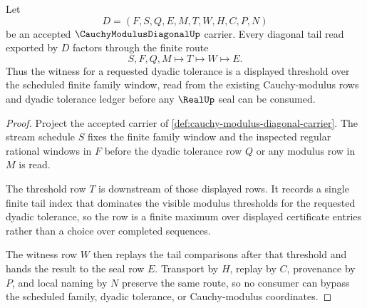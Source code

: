 \begin{theorem}
\label{thm:cauchy-modulus-diagonal-tail-witness}
Let
$$
D=(F,S,Q,E,M,T,W,H,C,P,N)
$$
be an accepted $\CauchyModulusDiagonalUp$ carrier. Every diagonal tail read exported by $D$ factors through the finite route
$$
S,F,Q,M \longmapsto T \longmapsto W \longmapsto E .
$$
Thus the witness for a requested dyadic tolerance is a displayed threshold over the scheduled finite family window, read from the existing Cauchy-modulus rows and dyadic tolerance ledger before any $\RealUp$ seal can be consumed.
\end{theorem}
\begin{proof}
Project the accepted carrier of \autoref{def:cauchy-modulus-diagonal-carrier}. The stream schedule $S$ fixes the finite family window and the inspected regular rational windows in $F$ before the dyadic tolerance row $Q$ or any modulus row in $M$ is read.

The threshold row $T$ is downstream of those displayed rows. It records a single finite tail index that dominates the visible modulus thresholds for the requested dyadic tolerance, so the row is a finite maximum over displayed certificate entries rather than a choice over completed sequences.

The witness row $W$ then replays the tail comparisons after that threshold and hands the result to the seal row $E$. Transport by $H$, replay by $C$, provenance by $P$, and local naming by $N$ preserve the same route, so no consumer can bypass the scheduled family, dyadic tolerance, or Cauchy-modulus coordinates.
\end{proof}

